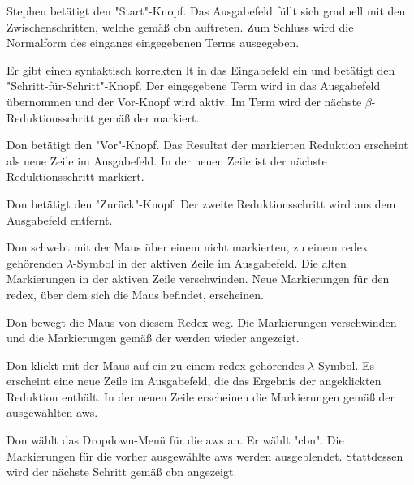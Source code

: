 \documentclass[parskip=full,11pt,twoside]{scrartcl}
\begin{document}
{Stephen betätigt den "Start"-Knopf.}
{Das Ausgabefeld füllt sich graduell mit den Zwischenschritten, welche gemäß \gls{cbn} auftreten.
Zum Schluss wird die Normalform des eingangs eingegebenen Terms ausgegeben.}


{Er gibt einen syntaktisch korrekten \gls{lt} in das Eingabefeld ein und betätigt
den "Schritt-für-Schritt"-Knopf.}
{Der eingegebene Term wird in das Ausgabefeld übernommen und der Vor-Knopf wird aktiv. Im Term wird der nächste $\beta$-Reduktionsschritt
gemäß der  markiert.}

{Don betätigt den "Vor"-Knopf.}
{Das Resultat der markierten Reduktion erscheint als neue Zeile im Ausgabefeld.
In der neuen Zeile ist der nächste Reduktionsschritt markiert.}

{Don betätigt den "Zurück"-Knopf.}
{Der zweite Reduktionsschritt wird aus dem Ausgabefeld entfernt.}

{Don schwebt mit der Maus über einem nicht markierten, zu einem \gls{redex} gehörenden
$\lambda$-Symbol in der aktiven Zeile im Ausgabefeld.}
{Die alten Markierungen in der aktiven Zeile verschwinden. Neue Markierungen für den \gls{redex}, über dem
sich die Maus befindet, erscheinen.}

{Don bewegt die Maus von diesem Redex weg.}
{Die Markierungen verschwinden und die Markierungen gemäß der 
werden wieder angezeigt.}

{Don klickt mit der Maus auf ein zu einem \gls{redex} gehörendes $\lambda$-Symbol.}
{Es erscheint eine neue Zeile im Ausgabefeld, die das Ergebnis der angeklickten
Reduktion enthält. In der neuen Zeile erscheinen die Markierungen gemäß der ausgewählten
\gls{aws}.}

{Don wählt das Dropdown-Menü für die \gls{aws} an. Er wählt "\gls{cbn}".}
{Die Markierungen für die vorher ausgewählte \gls{aws} werden ausgeblendet.
Stattdessen wird der nächste Schritt gemäß \gls{cbn} angezeigt.}
\end{document}
